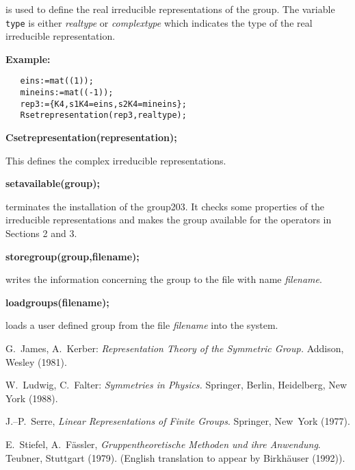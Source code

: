 is used to define the real irreducible representations of the group.
The variable {\tt type} is either {\em realtype} or {\em complextype}
which indicates the type of the real irreducible representation.

{\bf Example:}
\begin{verbatim}
   eins:=mat((1));
   mineins:=mat((-1));
   rep3:={K4,s1K4=eins,s2K4=mineins};
   Rsetrepresentation(rep3,realtype);
\end{verbatim}

{\bf Csetrepresentation(representation);}

This defines the complex irreducible representations.

{\bf setavailable(group);}

terminates the installation of the group203. It checks some properties of the
irreducible representations and makes the group available for the
operators in Sections 2 and 3.

{\bf storegroup(group,filename);}

writes the information concerning the group to the file with name
{\em filename}.

{\bf loadgroups(filename);}

loads a user defined group from the file {\em filename} into
the system.

\begin{thebibliography}{5}

 G.\ James, A.\ Kerber: {\it Representation Theory
of the Symmetric Group.} Addison, Wesley (1981).

 W.\ Ludwig, C.\ Falter: {\it Symmetries in Physics.}
Springer, Berlin, Heidelberg, New York (1988).

 J.--P.\ Serre, {\it Linear Representations of Finite
Groups}. Springer, New~York (1977).

 E.\  Stiefel, A.\  F{\"a}ssler, {\it Gruppentheoretische
Methoden und ihre Anwendung}. Teubner, Stuttgart (1979).
(English translation to appear by Birkh\"auser (1992)).

\end{thebibliography}

